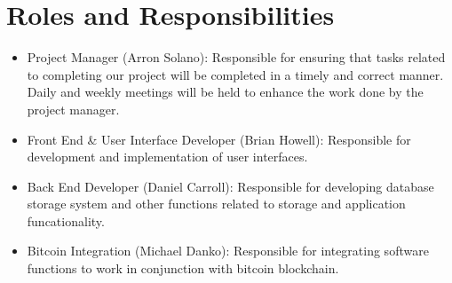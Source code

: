 \documentclass[12pt]{article}
\begin{document}
  

  \tableofcontents
  \listoffigures

  \clearpage

  \setcounter{page}{1}

  \section{Roles and Responsibilities}
  \begin{adjustwidth}{1.5em}{0pt}
    \begin{itemize}
      \item Project Manager (Arron Solano): Responsible for ensuring that tasks related to completing our project will be completed in a timely and correct manner. Daily and weekly meetings will be held to enhance the work done by the project manager.
      \item Front End \& User Interface Developer (Brian Howell): Responsible for development and implementation of user interfaces.
      \item Back End Developer (Daniel Carroll): Responsible for developing database storage system and other functions related to storage and application funcationality.
       \item Bitcoin Integration (Michael Danko): Responsible for integrating software functions to work in conjunction with bitcoin blockchain.
    \end{itemize}
    
\end{adjustwidth}
\end{document}
